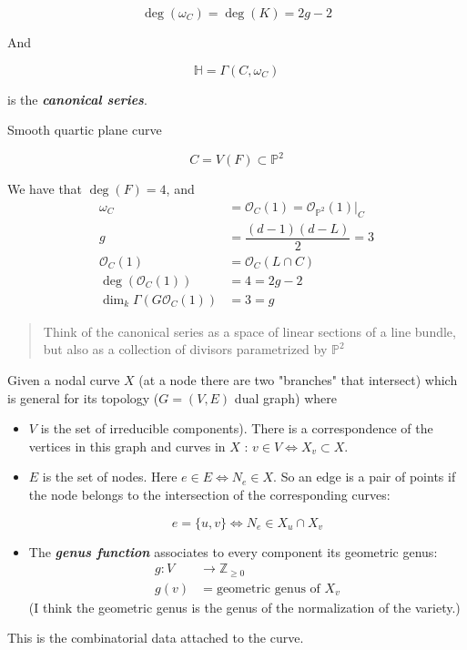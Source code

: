 $$
\operatorname{deg}(\omega_C)=
\operatorname{deg}(K)=2g-2
$$

And

$$
\mathbb{H}=\Gamma(C,\omega_C)
$$

is the \textit{\textbf{canonical series}}.

\begin{example}
\label{example-esteves1-1}
Smooth quartic plane curve

$$
C=V(F)\subset \mathbb{P}^2
$$

We have that $\operatorname{deg}(F)=4$, and
$$
\begin{aligned}
\omega_C&=\mathcal{O}_C(1)=\mathcal{O}_{
\mathbb{P}^2}(1)|_{C}\\
g&=\dfrac{(d-1)(d-L)}{2}=3\\
\mathcal{O}_C(1)&=\mathcal{O}_C(L\cap C)\\
\operatorname{deg}(\mathcal{O}_C(1))&=4=
2g-2\\
\dim_k\Gamma(G\mathcal{O}_C(1))&=3=g
\end{aligned}
$$
\end{example}
\begin{quotation}
Think of the canonical series as a space of
linear sections of a line bundle, but also as
a collection of divisors parametrized by
$\mathbb{P}^2$
\end{quotation}

\begin{example}
\label{example-esteves1-2}
\end{example}

\medskip{}

Given a nodal curve $X$ (at a node there are
two "branches" that intersect) which is
general for its topology ($G=(V,E)$ dual
graph) where
\begin{itemize}
\item $V$ is the set of irreducible
components). There is a correspondence of the
vertices in this graph and curves in $X$ :
$v\in V\iff X_v \subset X$.
\item $E$ is the set of nodes. Here $e \in
E\iff N_e\in X$. So an edge is a pair of
points if the node belongs to the
intersection of the corresponding curves:

$$
e=\{u,v\} \iff N_e\in X_u\cap X_v
$$

\item The \textit{\textbf{genus function}}
associates to every component its geometric
genus:
$$
\begin{aligned}
g: V &\longrightarrow \mathbb{Z}_{\geq 0} \\
g(v) &=\text{geometric genus of }X_v
\end{aligned}
$$
(I think the geometric genus is the genus of
the normalization of the variety.)
\end{itemize}
This is the combinatorial data attached to
the curve.

